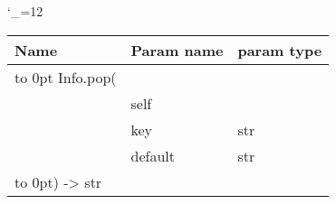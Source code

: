 \begingroup \catcode`\_=12 \tt
\begin{tabular}{lll}
\toprule
\textrm{Name}&\textrm{Param name}&\textrm{param type}\\
\midrule
\hbox to 0pt {Info.pop(\hss}\\
& self\\
& key & str\\
& default & str\\
\hbox to 0pt{) -> str\hss}\\
\bottomrule
\end{tabular}
\endgroup
